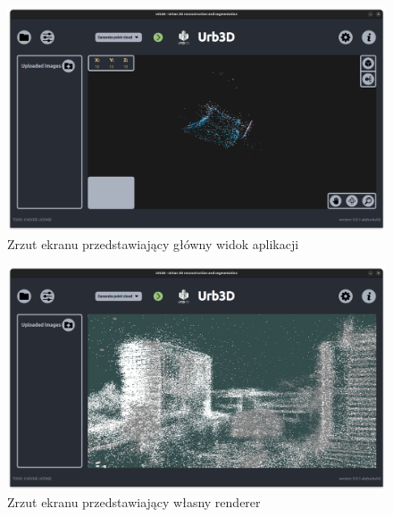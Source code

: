 \begin{figure}[!ht]
    \centering
    \includegraphics[width=\textwidth]{images/UI-Rendering.png}
    \caption{Zrzut ekranu przedstawiający główny widok aplikacji}
    \label{fig:ui}
\end{figure}

\begin{figure}[!ht]
    \centering
    \includegraphics[width=\textwidth]{images/cloud_rendering.png}
    \caption{Zrzut ekranu przedstawiający własny renderer}
    \label{fig:rendering}
\end{figure}
